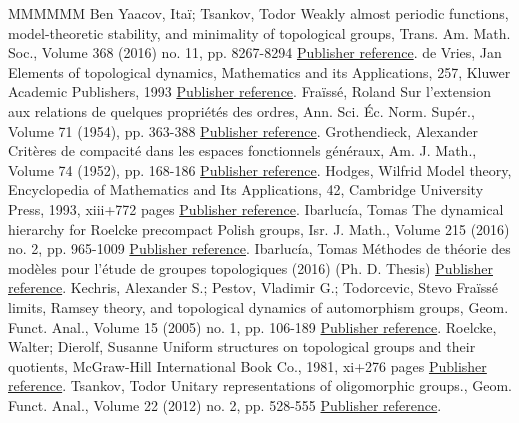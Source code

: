 \begin{thebibliography}{MMMMMM}
 Ben Yaacov, Itaï; Tsankov, Todor Weakly almost periodic functions, model-theoretic stability, and minimality of topological groups, Trans. Am. Math. Soc., Volume 368 (2016) no. 11, pp. 8267-8294 \href{https://ahl.centre-mersenne.org/item/AHL_2019__2__149_0/#BYT}{Publisher reference}.
 de Vries, Jan Elements of topological dynamics, Mathematics and its Applications, 257, Kluwer Academic Publishers, 1993 \href{https://ahl.centre-mersenne.org/item/AHL_2019__2__149_0/#dV}{Publisher reference}.
 Fraïssé, Roland Sur l’extension aux relations de quelques propriétés des ordres, Ann. Sci. Éc. Norm. Supér., Volume 71 (1954), pp. 363-388 \href{https://ahl.centre-mersenne.org/item/AHL_2019__2__149_0/#Fr0}{Publisher reference}.
 Grothendieck, Alexander Critères de compacité dans les espaces fonctionnels généraux, Am. J. Math., Volume 74 (1952), pp. 168-186 \href{https://ahl.centre-mersenne.org/item/AHL_2019__2__149_0/#Grothendieck}{Publisher reference}.
 Hodges, Wilfrid Model theory, Encyclopedia of Mathematics and Its Applications, 42, Cambridge University Press, 1993, xiii+772 pages \href{https://ahl.centre-mersenne.org/item/AHL_2019__2__149_0/#H}{Publisher reference}.
 Ibarlucía, Tomas The dynamical hierarchy for Roelcke precompact Polish groups, Isr. J. Math., Volume 215 (2016) no. 2, pp. 965-1009 \href{https://ahl.centre-mersenne.org/item/AHL_2019__2__149_0/#I1}{Publisher reference}.
 Ibarlucía, Tomas Méthodes de théorie des modèles pour l’étude de groupes topologiques (2016) (Ph. D. Thesis) \href{https://ahl.centre-mersenne.org/item/AHL_2019__2__149_0/#I0}{Publisher reference}.
 Kechris, Alexander S.; Pestov, Vladimir G.; Todorcevic, Stevo Fraïssé limits, Ramsey theory, and topological dynamics of automorphism groups, Geom. Funct. Anal., Volume 15 (2005) no. 1, pp. 106-189 \href{https://ahl.centre-mersenne.org/item/AHL_2019__2__149_0/#KPT}{Publisher reference}.
 Roelcke, Walter; Dierolf, Susanne Uniform structures on topological groups and their quotients, McGraw-Hill International Book Co., 1981, xi+276 pages \href{https://ahl.centre-mersenne.org/item/AHL_2019__2__149_0/#RD}{Publisher reference}.
 Tsankov, Todor Unitary representations of oligomorphic groups., Geom. Funct. Anal., Volume 22 (2012) no. 2, pp. 528-555 \href{https://ahl.centre-mersenne.org/item/AHL_2019__2__149_0/#Ts}{Publisher reference}.

\end{thebibliography}
